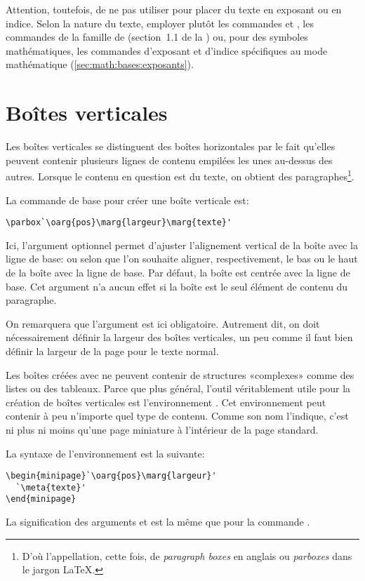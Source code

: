 Attention, toutefois, de ne pas utiliser \cmd{\raisebox} pour placer
du texte en exposant ou en indice. Selon la nature du texte, employer
plutôt les commandes \cmd{\textsuperscript} et \cmd{\textsubscript},
les commandes de la famille \cmd{\ieme} de  (section~1.1 de
la %
) ou, pour des
symboles mathématiques, les commandes d'exposant et d'indice
spécifiques au mode mathématique (\autoref{sec:math:bases:exposants}).

\section{Boîtes verticales}
\label{sec:boites:parbox}

Les boîtes verticales se distinguent des boîtes horizontales par le
fait qu'elles peuvent contenir plusieurs lignes de contenu empilées
les unes au-dessus des autres. Lorsque le contenu en question est du
texte, on obtient des paragraphes\footnote{%
  D'où l'appellation, cette fois, de \emph{paragraph boxes} en anglais
  ou \emph{parboxes} dans le jargon {\LaTeX}.}. %

La commande de base pour créer une boîte verticale est:
\begin{lstlisting}
\parbox`\oarg{pos}\marg{largeur}\marg{texte}'
\end{lstlisting}
Ici, l'argument optionnel  permet d'ajuster l'alignement
vertical de la boîte avec la ligne de base:  ou  selon
que l'on souhaite aligner, respectivement, le bas ou le haut de la
boîte avec la ligne de base. Par défaut, la boîte est centrée avec la
ligne de base. Cet argument n'a aucun effet si la boîte est le seul
élément de contenu du paragraphe.

On remarquera que l'argument  est ici obligatoire.
Autrement dit, on doit nécessairement définir la largeur des boîtes
verticales, un peu comme il faut bien définir la largeur de la page
pour le texte normal.

Les boîtes créées avec \cmd{\parbox} ne peuvent contenir de structures
«complexes» comme des listes ou des tableaux. Parce que plus général,
l'outil véritablement utile pour la création de boîtes verticales est
l'environnement . Cet environnement peut contenir à peu
n'importe quel type de contenu. Comme son nom l'indique, c'est ni plus
ni moins qu'une page miniature à l'intérieur de la page standard.

La syntaxe de l'environnement  est la suivante:
\begin{lstlisting}
\begin{minipage}`\oarg{pos}\marg{largeur}'
  `\meta{texte}'
\end{minipage}
\end{lstlisting}
La signification des arguments  et  est la
même que pour la commande .

